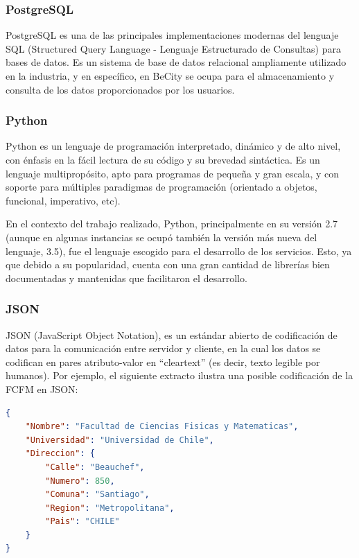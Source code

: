 \documentclass[11pt,letterpaper]{article}
\begin{document}

\subsubsection{PostgreSQL}

PostgreSQL\cite{postgres} es una de las principales implementaciones modernas del lenguaje SQL (Structured Query Language - Lenguaje Estructurado de Consultas) para bases de datos. Es un sistema de base de datos relacional ampliamente utilizado en la industria, y en específico, en BeCity se ocupa para el almacenamiento y consulta de los datos proporcionados por los usuarios.

\subsubsection{Python}

Python es un lenguaje de programación interpretado, dinámico y de alto nivel, con énfasis en la fácil lectura de su código y su brevedad sintáctica. Es un lenguaje multipropósito, apto para programas de pequeña y gran escala, y con soporte para múltiples paradigmas de programación (orientado a objetos, funcional, imperativo, etc).

En el contexto del trabajo realizado, Python, principalmente en su versión 2.7 (aunque en algunas instancias se ocupó también la versión más nueva del lenguaje, 3.5), fue el lenguaje escogido para el desarrollo de los servicios. Esto, ya que debido a su popularidad, cuenta con una gran cantidad de librerías bien documentadas y mantenidas que facilitaron el desarrollo.

\subsubsection{JSON}

JSON (JavaScript Object Notation), es un estándar abierto de codificación de datos para la comunicación entre servidor y cliente, en la cual los datos se codifican en pares atributo-valor en ``cleartext'' (es decir, texto legible por humanos).
Por ejemplo, el siguiente extracto ilustra una posible codificación de la FCFM en JSON:
\begin{lstlisting}[language=JSON]
{
    "Nombre": "Facultad de Ciencias Fisicas y Matematicas",
    "Universidad": "Universidad de Chile",
    "Direccion": {
        "Calle": "Beauchef",
        "Numero": 850,
        "Comuna": "Santiago",
        "Region": "Metropolitana",
        "Pais": "CHILE"
    }
}
\end{lstlisting}
\end{document}
